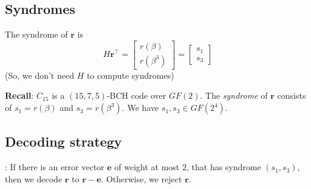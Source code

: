 \subsection*{Syndromes}
The syndrome of $ \symbf{r} $ is
\[ H\symbf{r}^\top=
    \begin{bmatrix}
        r(\beta) \\
        r(\beta^3)
    \end{bmatrix}=
    \begin{bmatrix}
        s_1 \\
        s_3
    \end{bmatrix} \]
(So, we don't need $ H $ to compute syndromes)

\textbf{Recall}: $ C_{15} $ is a $ (15,7,5) $-BCH code over $ GF(2) $.
The \emph{syndrome} of $ \symbf{r} $ consists of $ s_1=r(\beta) $
and $ s_3=r(\beta^3) $. We have $ s_1,s_3\in GF(2^4) $.

\subsection*{Decoding strategy}: If there is an error vector $ \symbf{e} $
of weight at most $ 2 $, that has syndrome $ (s_1,s_3) $, then we decode
$ \symbf{r} $ to $ \symbf{r}-\symbf{e} $. Otherwise, we reject $ \symbf{r} $.


